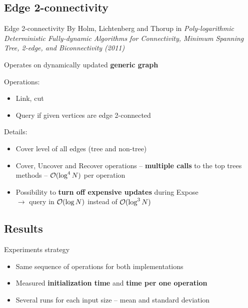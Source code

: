 \documentclass{beamer}				%
\begin{document}
\subsection{Edge 2-connectivity}
\begin{frame}{Edge 2-connectivity}
By Holm, Lichtenberg and Thorup in {\it Poly-logarithmic
Deterministic Fully-dynamic Algorithms for Connectivity, Minimum Spanning Tree,
2-edge, and Biconnectivity (2011)}

\bigskip

Operates on dynamically updated {\bf generic graph}

\bigskip\pause

Operations:
\begin{itemize}
	\item Link, cut
	\item Query if given vertices are edge 2-connected
\end{itemize}

\bigskip\pause
Details:
\begin{itemize}
\item Cover level of all edges (tree and non-tree)
\item Cover, Uncover and Recover operations -- {\bf multiple calls} to the
top trees methods -- ${\cal O}(\log^4 N)$ per operation
\pause\item Possibility to {\bf turn off expensive updates} during Expose\\ $\rightarrow$
query in ${\cal O}(\log N)$ instead of ${\cal O}(\log^3 N)$
\end{itemize}

\end{frame}

\subsection{Results}

\begin{frame}{Experiments strategy}
\begin{itemize}
\item Same sequence of operations for both implementations
\item Measured {\bf initialization time} and {\bf time per one operation}
\item Several runs for each input size -- mean and standard deviation
\end{itemize}
\end{frame}
\end{document}
